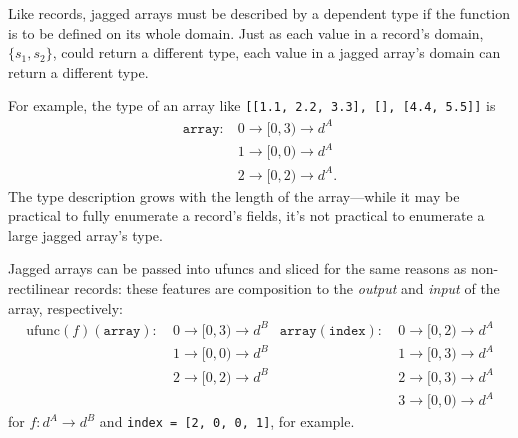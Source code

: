 \documentclass[12pt]{article}
\begin{document}
Like records, jagged arrays must be described by a dependent type if the function is to be defined on its whole domain. Just as each value in a record's domain, $\{s_1, s_2\}$, could return a different type, each value in a jagged array's domain can return a different type.

For example, the type of an array like \texttt{[[1.1, 2.2, 3.3], [], [4.4, 5.5]]} is
\begin{align*}
\texttt{array}: &\ 0 \to [0, 3) \to d^A \\
 &\ 1 \to [0, 0) \to d^A \\
 &\ 2 \to [0, 2) \to d^A\mbox{.}
\end{align*}
\noindent The type description grows with the length of the array---while it may be practical to fully enumerate a record's fields, it's not practical to enumerate a large jagged array's type.

Jagged arrays can be passed into ufuncs and sliced for the same reasons as non-rectilinear records: these features are composition to the {\it output} and {\it input} of the array, respectively:
\begin{align*}
\mbox{ufunc}(f)(\texttt{array}): &\ 0 \to [0, 3) \to d^B & \texttt{array}(\texttt{index}): &\ 0 \to [0, 2) \to d^A \\
 &\ 1 \to [0, 0) \to d^B                                             & &\ 1 \to [0, 3) \to d^A \\
 &\ 2 \to [0, 2) \to d^B                                             & &\ 2 \to [0, 3) \to d^A \\
 &                                                                   & &\ 3 \to [0, 0) \to d^A
\end{align*}
\noindent for $f: d^A \to d^B$ and \texttt{index = [2, 0, 0, 1]}, for example.
\end{document}
